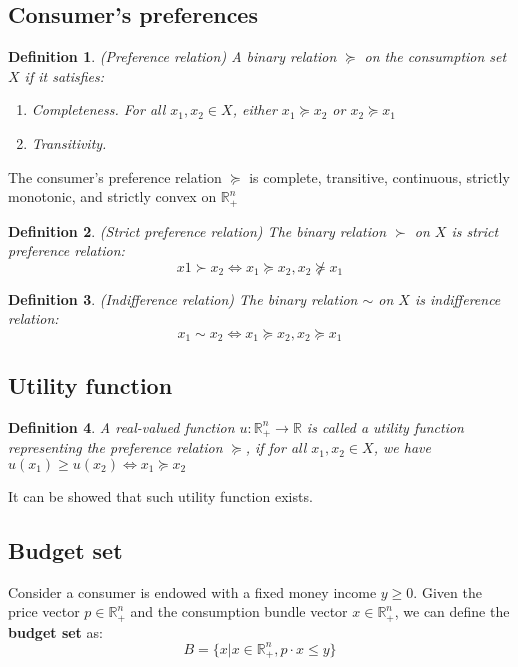\documentclass[a4paper,13pt]{report}
\newcommand{\R}{\mathbb{R}}
\newtheorem*{definition}{Definition}
\begin{document}
\subsection{Consumer's preferences}
\begin{definition}
(Preference relation) A binary relation $\succeq$ on the consumption set $X$ if it satisfies:
\begin{enumerate}
    \item Completeness. For all $x_1,x_2\in X$, either $x_1 \succeq x_2$ or $x_2 \succeq x_1$
    \item Transitivity.
\end{enumerate}
\end{definition}
The consumer's preference relation $\succeq$ is complete, transitive, continuous, strictly monotonic, and strictly convex on $\R^n_+$

\begin{definition}
(Strict preference relation) The binary relation $\succ$ on $X$ is strict preference relation:
$$x1 \succ x_2 \Leftrightarrow x_1 \succeq x_2,x_2 \nsucceq x_1$$
\end{definition}

\begin{definition}
(Indifference relation) The binary relation $\sim$ on $X$ is indifference relation:
$$x_1 \sim x_2 \Leftrightarrow x_1 \succeq x_2,x_2 \succeq x_1$$
\end{definition}

\subsection{Utility function}
\begin{definition}
A real-valued function $u:\R^n_+ \rightarrow \R$ is called a utility function representing the preference relation $\succeq$, if for all $x_1,x_2\in X$, we have $u(x_1) \geq u(x_2) \Leftrightarrow x_1\succeq x_2$
\end{definition}
It can be showed that such utility function exists. \cite{jehle2001advanced}

\subsection{Budget set}
Consider a consumer is endowed with a fixed money income $y\geq 0$. Given the price vector $p\in \R^n_+$ and the consumption bundle vector $x\in \R^n_+$, we can define the \textbf{budget set} as:
$$B=\{x|x\in  \R^n_+, p\cdot x \leq y\}$$
\end{document}
